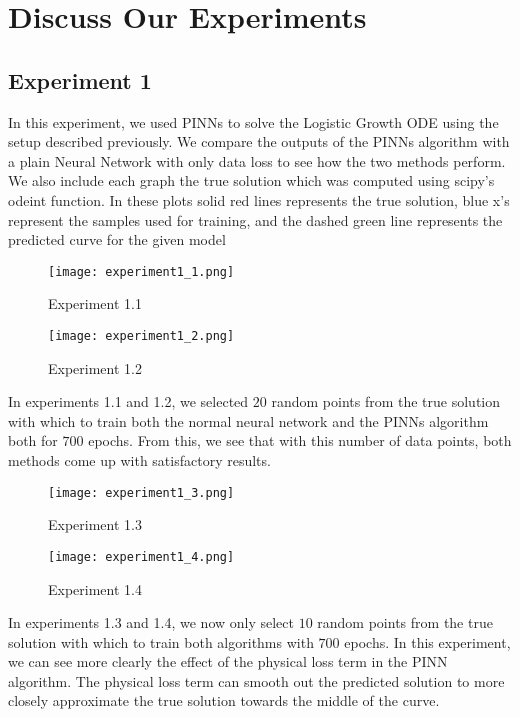 \documentclass{article}
\begin{document}
\section{Discuss Our Experiments}

\subsection*{Experiment 1}

In this experiment, we used PINNs to solve the Logistic Growth ODE using the setup described previously. We compare the outputs of the PINNs algorithm with a plain Neural Network with only data loss to see how the two methods perform. We also include each graph the true solution which was computed using scipy's odeint function. In these plots solid red lines represents the true solution, blue x's represent the samples used for training, and the dashed green line represents the predicted curve for the given model

\begin{figure}[H]
    \centering
    \texttt{[image: experiment1\_1.png]}
    \caption{Experiment 1.1}
\end{figure}

\begin{figure}[H]
    \centering
    \texttt{[image: experiment1\_2.png]}
    \caption{Experiment 1.2}
\end{figure}

In experiments 1.1 and 1.2, we selected $20$ random points from the true solution with which to train both the normal neural network and the PINNs algorithm both for $700$ epochs. From this, we see that with this number of data points, both methods come up with satisfactory results.

\begin{figure}[H]
    \centering
    \texttt{[image: experiment1\_3.png]}
    \caption{Experiment 1.3}
\end{figure}

\begin{figure}[H]
    \centering
    \texttt{[image: experiment1\_4.png]}
    \caption{Experiment 1.4}
\end{figure}

In experiments 1.3 and 1.4, we now only select $10$ random points from the true solution with which to train both algorithms with $700$ epochs. In this experiment, we can see more clearly the effect of the physical loss term in the PINN algorithm. The physical loss term can smooth out the predicted solution to more closely approximate the true solution towards the middle of the curve. 
\end{document}
